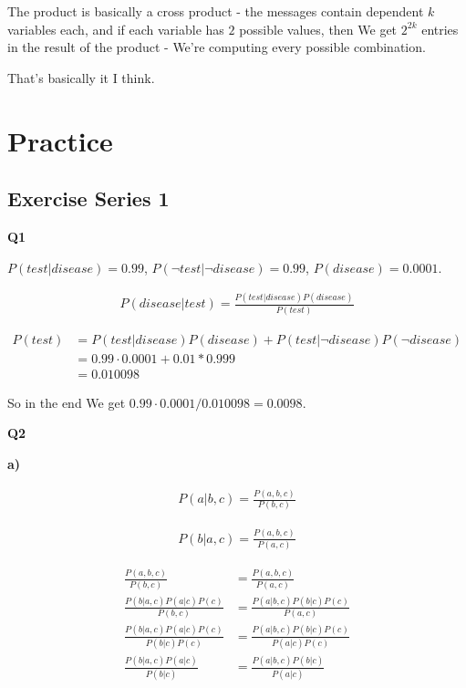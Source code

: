 \documentclass{article}
\begin{document}
		The product is basically a cross product - the messages contain dependent $k$ variables each, and if each variable has $2$ possible values, then We get $2^{2k}$ entries in the result of the product - We're computing every possible combination.
		
		That's basically it I think.
		
		
		
		
		
		
		
		
		
\newpage
\section{Practice}

	\subsection*{Exercise Series 1}
	
		\textbf{Q1}

			$P(test|disease)=0.99$, $P(\neg test| \neg disease) = 0.99$, $P(disease) = 0.0001$.
			
			\begin{align}
				P(disease | test) = \frac{P(test|disease)P(disease)}{P(test)}
			\end{align}
			
			\begin{align}
				P(test) &= P(test|disease)P(disease) + P(test|\neg disease)P(\neg disease)\\
				&= 0.99\cdot 0.0001 + 0.01*0.999\\
				&= 0.010098
			\end{align}
			
			So in the end We get $0.99\cdot 0.0001/0.010098=0.0098$.
			
		\textbf{Q2}
		
			\textbf{a)}
		
				\begin{align}
					P(a|b, c) = \frac{P(a, b ,c)}{P(b, c)}
				\end{align}
				
				\begin{align}
					P(b|a, c) = \frac{P(a, b, c)}{P(a, c)}
				\end{align}
				
				\begin{align}
					\frac{P(a, b ,c)}{P(b, c)} &= \frac{P(a, b, c)}{P(a, c)}\\
					\frac{P(b|a, c)P(a|c)P(c)}{P(b, c)} &= \frac{P(a|b, c)P(b|c)P(c)}{P(a, c)}\\
					\frac{P(b|a, c)P(a|c)P(c)}{P(b|c)P(c)} &= \frac{P(a|b, c)P(b|c)P(c)}{P(a|c)P(c)}\\
					\frac{P(b|a, c)P(a|c)}{P(b|c)} &= \frac{P(a|b, c)P(b|c)}{P(a|c)}
				\end{align}
				
\end{document}
